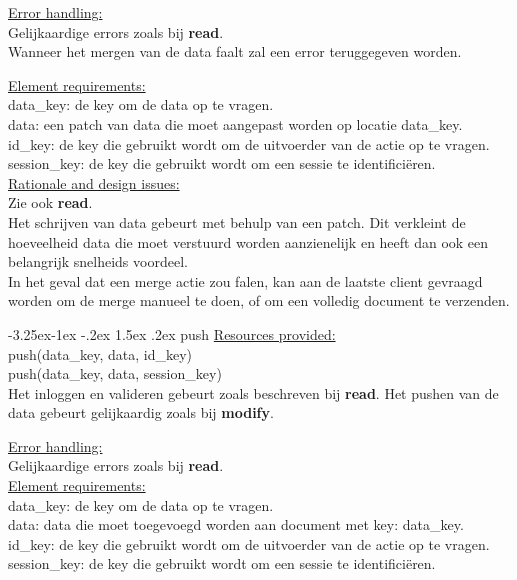 \documentclass[a4paper,10pt]{book}
\makeatletter
\renewcommand\paragraph{\@startsection{paragraph}{4}{\z@}%
  {-3.25ex\@plus -1ex \@minus -.2ex}%
  {1.5ex \@plus .2ex}%
  {\normalfont\normalsize\bfseries}}
\makeatother
\begin{document}
\underline{Error handling:}\\
Gelijkaardige errors zoals bij \textbf{read}.\\
Wanneer het mergen van de data faalt zal een error teruggegeven worden.

\underline{Element requirements:}\\
data\_key: de key om de data op te vragen.\\
data: een patch van data die moet aangepast worden op locatie data\_key.\\ 
id\_key: de key die gebruikt wordt om de uitvoerder van de actie op te vragen.\\
session\_key: de key die gebruikt wordt om een sessie te identifici\"{e}ren.\\

\underline{Rationale and design issues:}\\
Zie ook \textbf{read}.\\
Het schrijven van data gebeurt met behulp van een patch.  Dit verkleint de hoeveelheid data die moet verstuurd worden aanzienelijk en heeft dan ook een belangrijk snelheids voordeel.\\
In het geval dat een merge actie zou falen, kan aan de laatste client gevraagd worden om de merge manueel te doen, of om een volledig document te verzenden.

\paragraph{push}
\underline{Resources provided:}\\
push(data\_key, data, id\_key)\\
push(data\_key, data, session\_key)\\
Het inloggen en valideren gebeurt zoals beschreven bij \textbf{read}.
Het pushen van de data gebeurt gelijkaardig zoals bij \textbf{modify}.

\underline{Error handling:}\\
Gelijkaardige errors zoals bij \textbf{read}.\\

\underline{Element requirements:}\\
data\_key: de key om de data op te vragen.\\
data: data die moet toegevoegd worden aan document met key: data\_key.\\
id\_key: de key die gebruikt wordt om de uitvoerder van de actie op te vragen.\\
session\_key: de key die gebruikt wordt om een sessie te identifici\"{e}ren.\\
\end{document}
